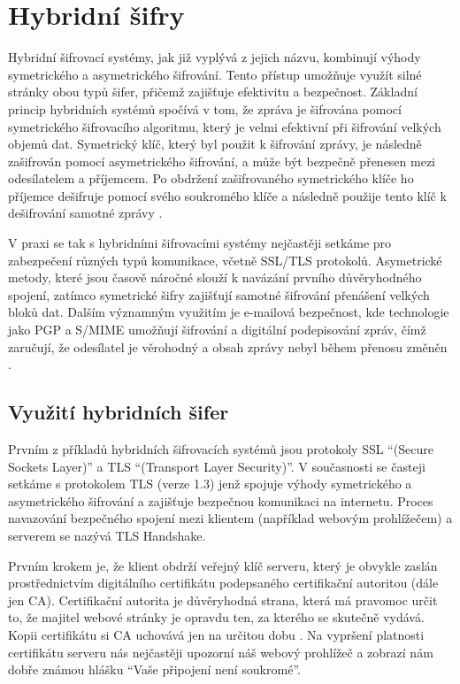 \section{Hybridní šifry}
\label{sec:hybridni-sifra}

Hybridní šifrovací systémy, jak již vyplývá z jejich názvu, kombinují výhody symetrického a asymetrického šifrování. Tento přístup umožňuje využít silné stránky obou typů šifer, přičemž zajišťuje efektivitu a bezpečnost.
Základní princip hybridních systémů spočívá v tom, že zpráva je šifrována pomocí symetrického šifrovacího algoritmu, který je velmi efektivní při šifrování velkých objemů dat. Symetrický klíč, který byl použit k šifrování zprávy, je následně zašifrován pomocí asymetrického šifrování, a může být bezpečně přenesen mezi odesílatelem a příjemcem. Po obdržení zašifrovaného symetrického klíče ho příjemce dešifruje pomocí svého soukromého klíče a následně použije tento klíč k dešifrování samotné zprávy \parencite{pavlicek2012}.

V praxi se tak s hybridními šifrovacími systémy nejčastěji setkáme pro zabezpečení různých typů komunikace, včetně SSL/TLS protokolů. Asymetrické metody, které jsou časově náročné slouží k navázání prvního důvěryhodného spojení, zatímco symetrické šifry zajišťují samotné šifrování přenášení velkých bloků dat. Dalším významným využitím je e-mailová bezpečnost, kde technologie jako PGP a S/MIME umožňují šifrování a digitální podepisování zpráv, čímž zaručují, že odesílatel je věrohodný a obsah zprávy nebyl během přenosu změněn \parencite{sedlak2021}.

\subsection{Využití hybridních šifer}

Prvním z příkladů hybridních šifrovacích systémů jsou protokoly SSL \enquote{(Secure Sockets Layer)} a TLS \enquote{(Transport Layer Security)}. V současnosti se časteji setkáme s protokolem TLS (verze 1.3) jenž spojuje výhody symetrického a asymetrického šifrování a zajišťuje bezpečnou komunikaci na internetu. Proces navazování bezpečného spojení mezi klientem (například webovým prohlížečem) a serverem se nazývá TLS Handshake. 

Prvním krokem je, že klient obdrží veřejný klíč serveru, který je obvykle zaslán prostřednictvím digitálního certifikátu podepsaného certifikační autoritou (dále jen CA). Certifikační autorita je důvěryhodná strana, která má pravomoc určit to, že majitel webové stránky je opravdu ten, za kterého se skutečně vydává. Kopii certifikátu si CA uchovává jen na určitou dobu \parencite{cloudflare2024}. Na vypršení platnosti certifikátu serveru nás nejčastěji upozorní náš webový prohlížeč a zobrazí nám dobře známou hlášku \enquote{Vaše připojení není soukromé}. 

